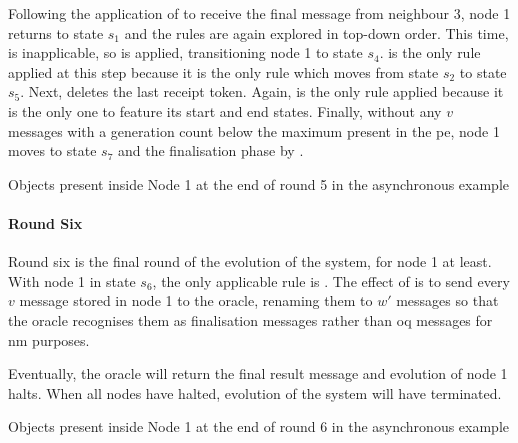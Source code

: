 Following the application of  to receive the final message from neighbour 3, node 1 returns to state \(s_1\) and the rules are again explored in top-down order.  This time,  is inapplicable, so  is applied, transitioning node 1 to state \(s_4\).   is the only rule applied at this step because it is the only rule which moves from state \(s_2\) to state \(s_5\).  Next,  deletes the last receipt token.  Again,  is the only rule applied because it is the only one to feature its start and end states.  Finally, without any \(v\) messages with a generation count below the maximum present in the \gls{pe}, node 1 moves to state \(s_7\) and the finalisation phase by .

\begin{cpobjectsfloat}
\begin{cpobjects}
\end{cpobjects}
\caption{\label{objs:nmp:ex5}Objects present inside Node 1 at the end of round 5 in the asynchronous  example}
\end{cpobjectsfloat}

\paragraph{Round Six}
Round six is the final round of the evolution of the system, for node 1 at least.  With node 1 in state \(s_6\), the only applicable rule is .  The effect of  is to send every \(v\) message stored in node 1 to the oracle, renaming them to \(w'\) messages so that the oracle recognises them as finalisation messages rather than \gls{oq} messages for \gls{nm} purposes.

Eventually, the oracle will return the final result message and evolution of node 1 halts.  When all nodes have halted, evolution of the system will have terminated.

\begin{cpobjectsfloat}
\begin{cpobjects}
\end{cpobjects}
\caption{\label{objs:nmp:ex6}Objects present inside Node 1 at the end of round 6 in the asynchronous  example}
\end{cpobjectsfloat}